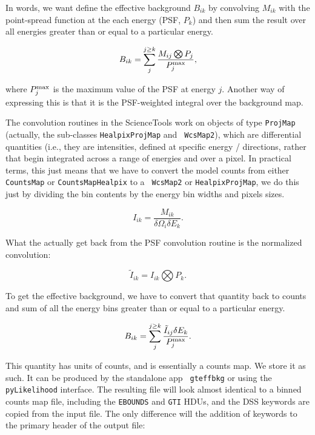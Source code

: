 \documentclass[preprint]{aastex}
\begin{document}
In words, we want define the effective background $B_{ik}$ by
convolving $M_{ik}$ with the point-spread function at the each energy
(PSF, $P_k$) and then sum the result over all energies greater than or
equal to a particular energy.

\begin{equation}
B_{ik} = \sum_{j}^{j \ge k} \frac{M_{ij} \bigotimes P_{j}}{P_{j}^{\rm max}}, 
\end{equation}

\noindent where $P_{j}^{\rm max}$ is the maximum value of the PSF at energy $j$.
Another way of expressing this is that it is the PSF-weighted integral over
the background map.  

The convolution routines in the ScienceTools work on objects of type
{\tt ProjMap} (actually, the sub-classes {\tt HealpixProjMap} and {\tt
  WcsMap2}), which are differential quantities (i.e., they are
intensities, defined at specific energy / directions, rather that
begin integrated across a range of energies and over a pixel.  In
practical terms, this just means that we have to convert the model
counts from either {\tt CountsMap} or {\tt CountsMapHealpix} to a {\tt
  WcsMap2} or {\tt HealpixProjMap}, we do this just by dividing the
bin contents by the energy bin widths and pixels sizes.

\begin{equation}
I_{ik} = \frac{M_{ik}}{\delta \Omega_i \delta E_k}.
\end{equation}

\noindent What the actually get back from the PSF convolution routine
is the normalized convolution:

\begin{equation}
\tilde{I}_{ik} = I_{ik} \bigotimes P_{k}.
\end{equation}

To get the effective background, we have to convert that quantity back
to counts and sum of all the energy bins greater than or equal to a
particular energy.

\begin{equation}
B_{ik} = \sum_{j}^{j \ge k} \frac{\tilde{I}_{ij} \delta E_k}{P_{j}^{\rm max}}.
\end{equation}

This quantity has units of counts, and is essentially a counts map.
We store it as such.  It can be produced by the standalone app {\tt
  gteffbkg} or using the {\tt pyLikelihood} interface.  The resulting
file will look almost identical to a binned counts map file, including
the {\tt EBOUNDS} and {\tt GTI} HDUs, and the DSS keywords are copied
from the input file.  The only difference will the addition of
keywords to the primary header of the output file:
\end{document}
